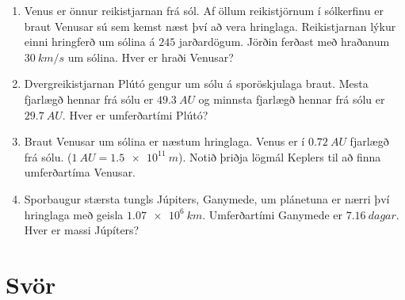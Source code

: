 \ifdefined \wholebook \else\documentclass[oneside]{book}\usepackage{EdlBook}\graphicspath{{figures/}}
\begin{document}
\begin{enumerate}[label = \textbf{Dæmi \thechapter.\arabic*.}]
\item Venus er önnur reikistjarnan frá sól. Af öllum reikistjörnum í sólkerfinu er braut Venusar sú sem kemst næst því að vera hringlaga. Reikistjarnan lýkur einni hringferð um sólina á $245$ jarðardögum. Jörðin ferðast með hraðanum $\SI{30}{km/s}$ um sólina. Hver er hraði Venusar?

\item Dvergreikistjarnan Plútó gengur um sólu á sporöskjulaga braut. Mesta fjarlægð hennar frá sólu er $\SI{49.3}{AU}$ og minnsta fjarlægð hennar frá sólu er $\SI{29.7}{AU}$. Hver er umferðartími Plútó?


\item Braut Venusar um sólina er næstum hringlaga. Venus er í $\SI{0.72}{AU}$ fjarlægð frá sólu. ($\SI{1}{AU} = \SI{1.5e11}{m}$). Notið þriðja lögmál Keplers til að finna umferðartíma Venusar.

\item Sporbaugur stærsta tungls Júpiters, Ganymede, um plánetuna er nærri því hringlaga með geisla $\SI{1.07e6}{km}$. Umferðartími Ganymede er $\SI{7.16}{dagar}$. Hver er massi Júpíters?

\end{enumerate}


\section*{Svör}
\end{document}
